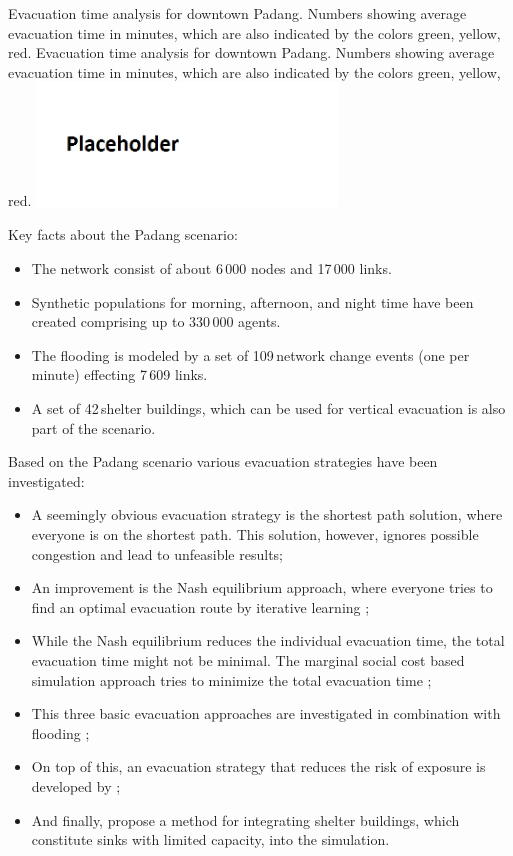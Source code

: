 %
\createfigure%
{Evacuation time analysis for downtown Padang. Numbers showing average evacuation time in minutes, which are also indicated by the colors green, yellow, red.}%
{Evacuation time analysis for downtown Padang. Numbers showing average evacuation time in minutes, which are also indicated by the colors green, yellow, red.}%
{\label{chap:using:padang}}%
{\includegraphics[width=0.6\textwidth, angle=0]{using/figures/dwntwnpdg}}%
{}

Key facts about the Padang scenario:
\begin{itemize}
\item The network consist of about 6\,000 nodes and 17\,000 links.
\item Synthetic populations for morning, afternoon, and night time have been created comprising up to 330\,000 agents.
\item The flooding is modeled by a set of 109\,network change events (one per minute) effecting 7\,609 links.
\item A set of 42\,shelter buildings, which can be used for vertical evacuation is also part of the scenario.
\end{itemize}
Based on the Padang scenario various evacuation strategies have been investigated:
\begin{itemize}
\item A seemingly obvious evacuation strategy is the shortest path solution, where everyone is on the shortest path. This solution, however, ignores possible congestion and lead to unfeasible results;
\item  An improvement is the Nash equilibrium approach, where everyone tries to find an optimal evacuation route by iterative learning \citep{LaemmelKluepfelNagel2009EvacPadangAtBookTimmermanns};
\item While the Nash equilibrium reduces the individual evacuation time, the total evacuation time might not be minimal. The marginal social cost based simulation approach tries to minimize the total evacuation time \citep{LaemmelFloetteroed_MertschingEtAl_2009,DresslerFloetteroedLaemmelNagelSkutella2010OptimalEvacuationLargeScaleScenarios};
\item This three basic evacuation approaches are investigated in combination with flooding \citep{LaemmelEtAl_TransResC_2010,Laemmel_PhDThesis_2011};
\item On top of this, an evacuation strategy that reduces the risk of exposure is developed by \citep{LaemmelKluepfelNagel2010PEDRiskPrinted};
\item And finally, \citet{FloetteroedLaemmel2010ICECShelterEvac} propose a method for integrating shelter buildings, which constitute sinks with limited capacity, into the simulation.  
\end{itemize}

